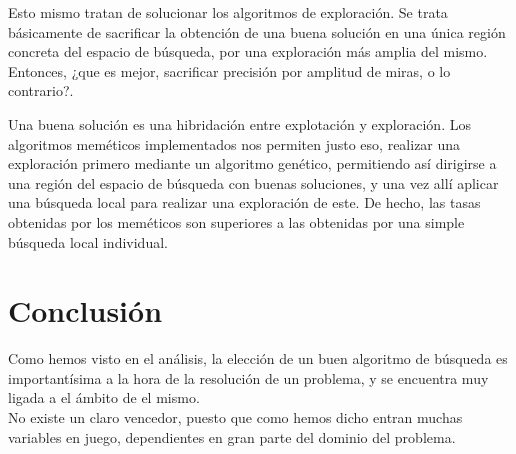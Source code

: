 Esto mismo tratan de solucionar los algoritmos de exploración. Se trata básicamente de sacrificar la obtención de una buena solución en una única región concreta del espacio de búsqueda, por una exploración más amplia del mismo.\\ 

Entonces, ¿que es mejor, sacrificar precisión por amplitud de miras, o lo contrario?.

Una buena solución es una hibridación entre explotación y exploración. Los algoritmos meméticos implementados nos permiten justo eso, realizar una exploración primero mediante un algoritmo genético, permitiendo así dirigirse a una región del espacio de búsqueda con buenas soluciones, y una vez allí aplicar una búsqueda local para realizar una exploración de este. De hecho, las tasas obtenidas por los meméticos son superiores a las obtenidas por una simple búsqueda local individual.

\section{Conclusión}
Como hemos visto en el análisis, la elección de un buen algoritmo de búsqueda es importantísima a la hora de la resolución de un problema, y se encuentra muy ligada a el ámbito de el mismo.\\ 

No existe un claro vencedor, puesto que como hemos dicho entran muchas variables en juego, dependientes en gran parte del dominio del problema.

